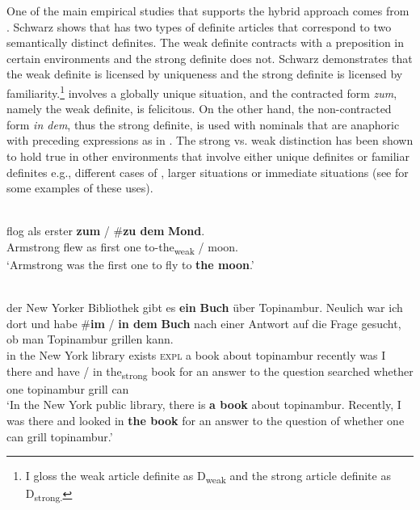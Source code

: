 \documentclass[output=paper,
modfonts
]{langscibook}
\begin{document}
One of the main empirical studies that supports the hybrid approach comes from \citet{Schwarz2009,Schwarz2013}. Schwarz shows that  has two types of definite articles that correspond to two semantically distinct definites. The weak definite contracts with a preposition in certain environments and the strong definite does not. Schwarz demonstrates that the weak definite is licensed by uniqueness and the strong definite is licensed by familiarity.\footnote{I gloss the weak article definite as D\textsubscript{weak} and the strong article definite as D\textsubscript{strong.}}  involves a globally unique situation, and the contracted form \textit{zum}, namely the weak definite, is felicitous. On the other hand, the non-contracted form \textit{in dem}, thus the strong definite, is used with nominals that are anaphoric with preceding expressions as in . The strong vs. weak distinction has been shown to hold true in other environments that involve either unique definites or familiar definites e.g., different cases of , larger situations or immediate situations (see  for some examples of these uses). 

\begin{exe}
	\ex \label{ex:sereikaite:16} 
	 \\
	 {flog} {als} {erster} {\textbf{zum}} \textnormal{/} \textnormal{\#}\textbf{zu dem} \textbf{{Mond}}.\\
	Armstrong flew as {first one} {to-the\textsubscript{weak}} /  {moon}.\\
	\trans `Armstrong was the first one to fly to \textbf{the moon}.' \citep[40]{Schwarz2009}
\end{exe}

\begin{exe}
	\ex \label{ex:sereikaite:17} 
	 \\
	 {der} {New} {Yorker} {Bibliothek} {gibt} {es} \textbf{{ein}} \textbf{{Buch}} {über} {Topinambur}. {Neulich} {war} {ich} {dort} {und} {habe} \textnormal{\#}\textbf{im} \textnormal{/} \textbf{in dem} \textbf{{Buch}} {nach} {einer} {Antwort} {auf} {die} {Frage} {gesucht}, {ob} {man} {Topinambur} {grillen} {kann}.\\
	in the New York library exists \textsc{expl} {a} {book} about topinambur recently was I there and have  / {in the\textsubscript{strong}} {book} for an answer to the question searched whether one topinambur grill can\\
	\trans `In the New York public library, there is \textbf{a book} about topinambur. Recently, I was there and looked in \textbf{the
		book} for an answer to the question of whether one can grill topinambur.’ \citep[30]{Schwarz2009}
\end{exe}
\end{document}
